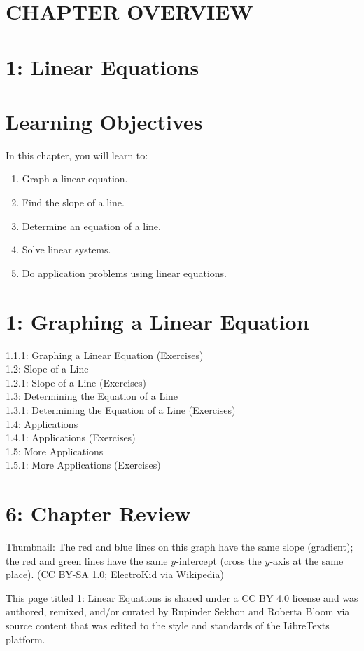 
\section*{CHAPTER OVERVIEW}
\section*{1: Linear Equations}
\section*{Learning Objectives}
In this chapter, you will learn to:

\begin{enumerate}
  \item Graph a linear equation.
  \item Find the slope of a line.
  \item Determine an equation of a line.
  \item Solve linear systems.
  \item Do application problems using linear equations.
\end{enumerate}

\section*{1: Graphing a Linear Equation}
1.1.1: Graphing a Linear Equation (Exercises)\\
1.2: Slope of a Line\\
1.2.1: Slope of a Line (Exercises)\\
1.3: Determining the Equation of a Line\\
1.3.1: Determining the Equation of a Line (Exercises)\\
1.4: Applications\\
1.4.1: Applications (Exercises)\\
1.5: More Applications\\
1.5.1: More Applications (Exercises)

\section*{6: Chapter Review}
Thumbnail: The red and blue lines on this graph have the same slope (gradient); the red and green lines have the same $y$-intercept (cross the $y$-axis at the same place). (CC BY-SA 1.0; ElectroKid via Wikipedia)

This page titled 1: Linear Equations is shared under a CC BY 4.0 license and was authored, remixed, and/or curated by Rupinder Sekhon and Roberta Bloom via source content that was edited to the style and standards of the LibreTexts platform.

